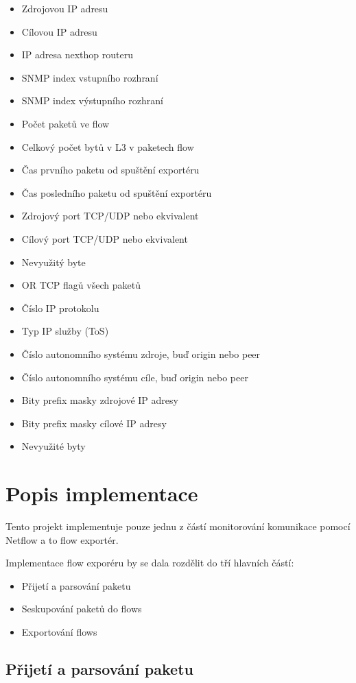 \documentclass{article}
\begin{document}
\begin{itemize}
    \item Zdrojovou IP adresu
    \item Cílovou IP adresu
    \item IP adresa nexthop routeru
    \item SNMP index vstupního rozhraní
    \item SNMP index výstupního rozhraní
    \item Počet paketů ve flow
    \item Celkový počet bytů v L3 v paketech flow
    \item Čas prvního paketu od spuštění exportéru
    \item Čas posledního paketu od spuštění exportéru
    \item Zdrojový port TCP/UDP nebo ekvivalent
    \item Cílový port TCP/UDP nebo ekvivalent
    \item Nevyužitý byte
    \item OR TCP flagů všech paketů
    \item Číslo IP protokolu
    \item Typ IP služby (ToS)
    \item Číslo autonomního systému zdroje, buď origin nebo peer
    \item Číslo autonomního systému cíle, buď origin nebo peer
    \item Bity prefix masky zdrojové IP adresy
    \item Bity prefix masky cílové IP adresy
    \item Nevyužité byty
\end{itemize}

\section{Popis implementace}

Tento projekt implementuje pouze jednu z částí monitorování komunikace pomocí
Netflow a to flow exportér.

Implementace flow exporéru by se dala rozdělit do tří hlavních částí:
\begin{itemize}
    \item Přijetí a parsování paketu
    \item Seskupování paketů do flows
    \item Exportování flows
\end{itemize}

\subsection{Přijetí a parsování paketu}
\end{document}
